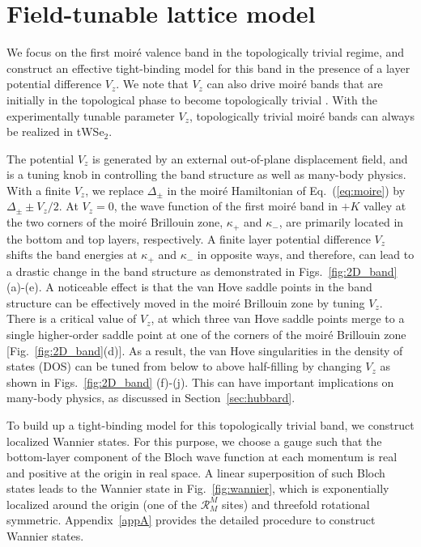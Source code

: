 \documentclass[aps,prx,floatfix,twocolumn]{revtex4-1}
\begin{document}
	\section{Field-tunable lattice model}\label{sec:field}
	We focus on the first moir\'e valence band in the topologically trivial regime, and construct an effective tight-binding model for this band in the presence of a layer potential difference $V_z$. We note that $V_z$ can also drive moir\'e bands that are initially in the topological phase to become topologically trivial \cite{wu2019topological}. With the experimentally tunable parameter $V_z$, topologically trivial moir\'e bands can always be realized in tWSe$_2$. 
	
	The potential $V_z$ is generated by an external out-of-plane displacement field, and is a tuning knob in controlling the band structure as well as many-body physics.  With a finite $V_z$, we replace $\Delta_{\pm}$ in the moir\'e Hamiltonian of Eq.~(\ref{eq:moire})  by  $\Delta_{\pm} \pm V_z/2$. At $V_z=0$, the wave function of the first moir\'e band in $+K$ valley at the two corners of the moir\'e Brillouin zone, $\kappa_+$ and $\kappa_-$, are primarily located in the bottom and top layers, respectively. A finite layer potential difference $V_z$ shifts the band energies at $\kappa_+$ and $\kappa_-$ in opposite ways, and therefore, can lead to a drastic change in the band structure as demonstrated in Figs.~\ref{fig:2D_band} (a)-(e). A noticeable effect is that the van Hove saddle points in the band structure can be effectively moved in the moir\'e Brillouin zone by tuning $V_z$. There is a critical value of $V_{z}$, at which three van Hove saddle points merge to a single higher-order saddle point \cite{yuan2019magic,bi2019excitonic,wu2019ferromagnetism} at one of the corners of the moir\'e Brillouin zone [Fig.~\ref{fig:2D_band}(d)]. As a result, the van Hove singularities in the density of states (DOS) can be tuned from below to above half-filling by changing $V_z$ as shown in  Figs.~\ref{fig:2D_band} (f)-(j). This can have important implications on many-body physics, as discussed in Section~\ref{sec:hubbard}.
	

 


	
	
	To build up a tight-binding model for this topologically trivial band, we  construct localized Wannier states. For this purpose, we choose a gauge such that the bottom-layer component of the Bloch wave function  at each momentum is real and positive at the origin in real space. A linear superposition of such Bloch states leads to the Wannier state in Fig.~\ref{fig:wannier}, which is exponentially localized around the origin (one of the $\mathcal{R}_M^M$ sites) and threefold rotational symmetric. Appendix~\ref{appA} provides the detailed procedure to construct Wannier states.
	
\end{document}
